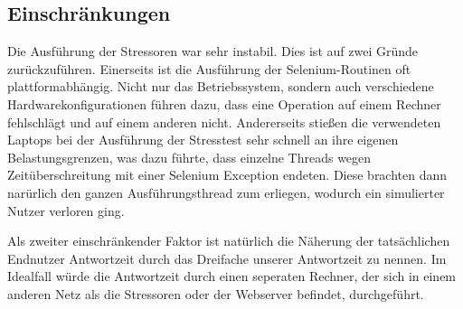 \subsection{Einschränkungen}

Die Ausführung der Stressoren war sehr instabil. Dies ist auf zwei Gründe zurückzuführen. Einerseits ist die Ausführung der Selenium-Routinen oft plattformabhängig. Nicht nur das Betriebssystem, sondern auch verschiedene Hardwarekonfigurationen führen dazu, dass eine Operation auf einem Rechner fehlschlägt und auf einem anderen nicht. Andererseits stießen die verwendeten Laptops bei der Ausführung der Stresstest sehr schnell an ihre eigenen Belastungsgrenzen, was dazu führte, dass einzelne Threads wegen Zeitüberschreitung mit einer Selenium Exception endeten. Diese brachten dann narürlich den ganzen Ausführungsthread zum erliegen, wodurch ein simulierter Nutzer verloren ging.

Als zweiter einschränkender Faktor ist natürlich die Näherung der tatsächlichen Endnutzer Antwortzeit durch das Dreifache unserer Antwortzeit zu nennen. Im Idealfall würde die Antwortzeit durch einen seperaten Rechner, der sich in einem anderen Netz als die Stressoren oder der Webserver befindet, durchgeführt.

